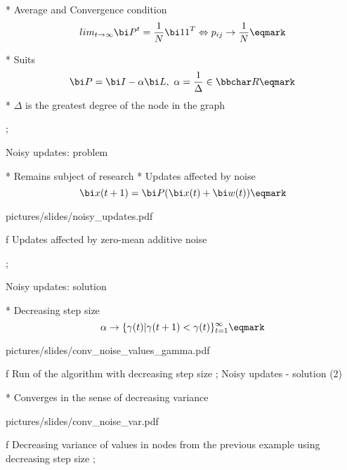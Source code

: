 * Average and Convergence condition \nl $$ lim_{t\rightarrow\infty} {\bi P}^t = {1\over N}{\bi 1 1}^T \Leftrightarrow  p_{ij} \rightarrow {1\over N} \eqmark $$

* Suits $${\bi P} = {\bi I} - \alpha {\bi L}, \ \alpha = {{1}\over{\Delta}} \in \bbchar R \eqmark $$
\begitems
* $\Delta$ is the greatest degree of the node in the graph
\enditems

\pg;


\sec Noisy updates: problem

* Remains subject of research
* Updates affected by noise  $$ {\bi x}(t+1) = {\bi P} ({\bi x}(t)+{\bi w}(t)) \eqmark$$


\centerline{\hsize \inspic pictures/slides/noisy_updates.pdf } 
\caption/f Updates affected by zero-mean additive noise


\pg;



\sec Noisy updates: solution


* Decreasing step size \nl $$\alpha \rightarrow \{ \gamma(t) | \gamma(t+1)<\gamma(t)  \}_{t=1}^\infty \eqmark$$


\centerline{\picw=14cm \inspic pictures/slides/conv_noise_values_gamma.pdf } 
\caption/f Run of the algorithm with decreasing step size
\pg;
\sec Noisy updates - solution (2)


* Converges in the sense of decreasing variance

\centerline{\picw=14cm \inspic pictures/slides/conv_noise_var.pdf } 
\caption/f Decreasing variance of values in nodes from the previous example using decreasing step size
\pg;







